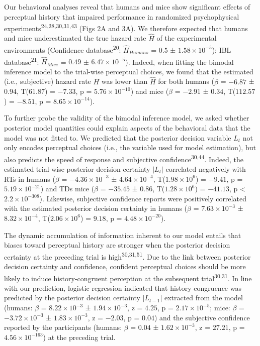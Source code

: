 \documentclass[
]{article}
\begin{document}
Our behavioral analyses reveal that humans and mice show significant
effects of perceptual history that impaired performance in randomized
psychophysical experiments\textsuperscript{24,28,30,31,43} (Figs 2A
and 3A). We therefore expected that humans and mice underestimated the
true hazard rate \(\hat{H}\) of the experimental environments
(Confidence database\textsuperscript{20}: \(\hat{H}_{Humans}\) = \(0.5\)
± \(\ensuremath{1.58\times 10^{-5}}\)); IBL
database\textsuperscript{21}: \(\hat{H}_{Mice}\) = \(0.49\) ±
\(\ensuremath{6.47\times 10^{-5}}\)). Indeed, when fitting the bimodal
inference model to the trial-wise perceptual choices, we found that the
estimated (i.e., subjective) hazard rate \(H\) was lower than
\(\hat{H}\) for both humans (\(\beta\) = \(-6.87\) ± \(0.94\),
T(\(61.87\)) = \(-7.33\), p = \(\ensuremath{5.76\times 10^{-10}}\)) and
mice (\(\beta\) = \(-2.91\) ± \(0.34\), T(\(112.57\)) = \(-8.51\), p =
\(\ensuremath{8.65\times 10^{-14}}\)).

To further probe the validity of the bimodal inference model, we asked
whether posterior model quantities could explain aspects of the
behavioral data that the model was not fitted to. We predicted that the
posterior decision variable \(L_t\) not only encodes perceptual choices
(i.e., the variable used for model estimation), but also predicts the
speed of response and subjective confidence\textsuperscript{30,44}.
Indeed, the estimated trial-wise posterior decision certainty \(|L_t|\)
correlated negatively with RTs in humans (\(\beta\) =
\(\ensuremath{-4.36\times 10^{-3}}\) ±
\(\ensuremath{4.64\times 10^{-4}}\),
T(\(\ensuremath{1.98\times 10^{6}}\)) = \(-9.41\), p =
\(\ensuremath{5.19\times 10^{-21}}\)) and TDs mice (\(\beta\) =
\(-35.45\) ± \(0.86\), T(\(\ensuremath{1.28\times 10^{6}}\)) =
\(-41.13\), p < \(\ensuremath{2.2\times 10^{-308}}\)). Likewise, subjective confidence reports were
positively correlated with the estimated posterior decision certainty in
humans (\(\beta\) = \(\ensuremath{7.63\times 10^{-3}}\) ±
\(\ensuremath{8.32\times 10^{-4}}\),
T(\(\ensuremath{2.06\times 10^{6}}\)) = \(9.18\), p =
\(\ensuremath{4.48\times 10^{-20}}\)).

The dynamic accumulation of information inherent to our model entails
that biases toward perceptual history are stronger when the posterior
decision certainty at the preceding trial is
high\textsuperscript{30,31,51}. Due to the link between posterior
decision certainty and confidence, confident perceptual choices should
be more likely to induce history-congruent perception at the subsequent
trial\textsuperscript{30,31}. In line with our prediction, logistic
regression indicated that history-congruence was predicted by the
posterior decision certainty \(|L_{t-1}|\) extracted from the model
(humans: \(\beta\) = \(\ensuremath{8.22\times 10^{-3}}\) ±
\(\ensuremath{1.94\times 10^{-3}}\), z = \(4.25\), p =
\(\ensuremath{2.17\times 10^{-5}}\); mice: \(\beta\) =
\(\ensuremath{-3.72\times 10^{-3}}\) ±
\(\ensuremath{1.83\times 10^{-3}}\), z = \(-2.03\), p = \(0.04\)) and
the subjective confidence reported by the participants (humans:
\(\beta\) = \(0.04\) ± \(\ensuremath{1.62\times 10^{-3}}\), z =
\(27.21\), p = \(\ensuremath{4.56\times 10^{-163}}\)) at the preceding
trial.
\end{document}
